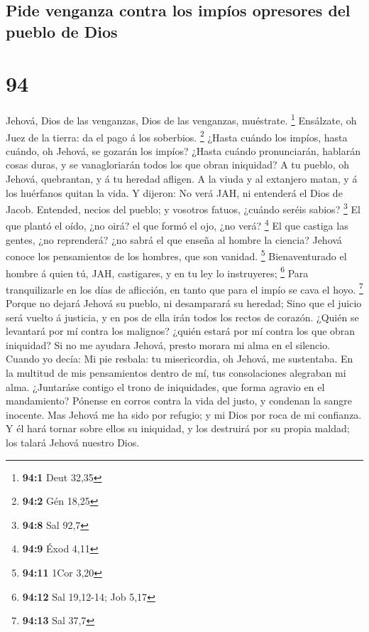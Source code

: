 \hypertarget{pide-venganza-contra-los-impuxedos-opresores-del-pueblo-de-dios}{%
\subsection{Pide venganza contra los impíos opresores del pueblo de
Dios}\label{pide-venganza-contra-los-impuxedos-opresores-del-pueblo-de-dios}}

\hypertarget{section-93}{%
\section{94}\label{section-93}}

 Jehová, Dios de las venganzas, Dios de las venganzas,
muéstrate. \footnote{\textbf{94:1} Deut 32,35}  Ensálzate,
oh Juez de la tierra: da el pago á los soberbios. \footnote{\textbf{94:2}
  Gén 18,25}  ¿Hasta cuándo los impíos, hasta cuándo, oh
Jehová, se gozarán los impíos?  ¿Hasta cuándo pronunciarán,
hablarán cosas duras, y se vanagloriarán todos los que obran iniquidad?
 A tu pueblo, oh Jehová, quebrantan, y á tu heredad afligen.
 A la viuda y al extanjero matan, y á los huérfanos quitan
la vida.  Y dijeron: No verá JAH, ni entenderá el Dios de
Jacob.  Entended, necios del pueblo; y vosotros fatuos,
¿cuándo seréis sabios? \footnote{\textbf{94:8} Sal 92,7}  El
que plantó el oído, ¿no oirá? el que formó el ojo, ¿no verá? \footnote{\textbf{94:9}
  Éxod 4,11}  El que castiga las gentes, ¿no reprenderá?
¿no sabrá el que enseña al hombre la ciencia?  Jehová
conoce los pensamientos de los hombres, que son vanidad. \footnote{\textbf{94:11}
  1Cor 3,20}  Bienaventurado el hombre á quien tú, JAH,
castigares, y en tu ley lo instruyeres; \footnote{\textbf{94:12} Sal
  19,12-14; Job 5,17}  Para tranquilizarle en los días de
aflicción, en tanto que para el impío se cava el hoyo. \footnote{\textbf{94:13}
  Sal 37,7}  Porque no dejará Jehová su pueblo, ni
desamparará su heredad;  Sino que el juicio será vuelto á
justicia, y en pos de ella irán todos los rectos de corazón.
 ¿Quién se levantará por mí contra los malignos? ¿quién
estará por mí contra los que obran iniquidad?  Si no me
ayudara Jehová, presto morara mi alma en el silencio. 
Cuando yo decía: Mi pie resbala: tu misericordia, oh Jehová, me
sustentaba.  En la multitud de mis pensamientos dentro de
mí, tus consolaciones alegraban mi alma.  ¿Juntaráse
contigo el trono de iniquidades, que forma agravio en el mandamiento?
 Pónense en corros contra la vida del justo, y condenan la
sangre inocente.  Mas Jehová me ha sido por refugio; y mi
Dios por roca de mi confianza.  Y él hará tornar sobre
ellos su iniquidad, y los destruirá por su propia maldad; los talará
Jehová nuestro Dios.


